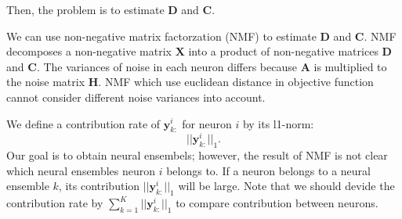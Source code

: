 Then, the problem is to estimate $\boldsymbol D$ and $\boldsymbol C$.

We can use non-negative matrix factorzation (NMF) to estimate $\boldsymbol D$ and $\boldsymbol C$.
NMF decomposes a non-negative matrix $\boldsymbol{X}$ into a product of non-negative matrices $\boldsymbol{D}$ and $\boldsymbol{C}$.
The variances of noise in each neuron differs because $\boldsymbol A$ is multiplied to the noise matrix $\boldsymbol H$.
NMF which use euclidean distance in objective function cannot consider different noise variances into account.

We define a contribution rate of $\boldsymbol{y}^i_{k:}$ for neuron $i$ by its l1-norm:
\begin{equation}
  || \boldsymbol{y}^i_{k:}||_1.
  \label{eq:contribution}
\end{equation}
Our goal is to obtain neural ensembels; however, the result of NMF is not clear which neural ensembles neuron $i$ belongs to.
If a neuron belongs to a neural ensemble $k$, its contribution $||\boldsymbol{y}^i_{k:}||_1$ will be large.
Note that we should devide the contribution rate by $\sum_{k=1}^K ||\boldsymbol{y}^i_{k:}||_1$ to compare contribution between neurons.
